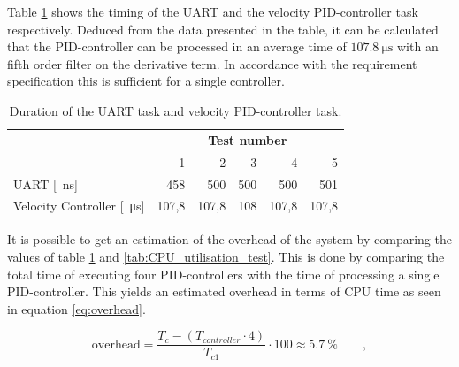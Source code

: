 \documentclass[../../main.tex]{subfiles}
\begin{document}
Table \ref{tab:Task_Timing} shows the timing of the UART and the velocity PID-controller task respectively. Deduced from the data presented in the table, it can be calculated that the PID-controller can be processed in an average time of $\SI{107,8}{\micro \second}$ with an fifth order filter on the derivative term. In accordance with the requirement specification this is sufficient for a single controller.
\begin{table}[H]
\centering
\begin{tabular}{lrrrrr}
\multicolumn{1}{c}{\textbf{}}            & \multicolumn{5}{c}{\textbf{Test number}}                                                                                                 \\
\multicolumn{1}{l|}{}                    & \multicolumn{1}{r|}{1}     & \multicolumn{1}{r|}{2}     & \multicolumn{1}{r|}{3}    & \multicolumn{1}{r|}{4}     & \multicolumn{1}{r}{5} \\ \hline
\multicolumn{1}{l|}{UART [\SI{}{\nano\second}]}                & \multicolumn{1}{r|}{458}   & \multicolumn{1}{r|}{500}   & \multicolumn{1}{r|}{500}  & \multicolumn{1}{r|}{500}   & 501                   \\
\multicolumn{1}{l|}{Velocity Controller [\SI{}{\micro\second}]} & \multicolumn{1}{r|}{107,8} & \multicolumn{1}{r|}{107,8} & \multicolumn{1}{r|}{108}  & \multicolumn{1}{r|}{107,8} & 107,8                
\end{tabular}
\caption{Duration of the  UART task and velocity PID-controller task.}
\label{tab:Task_Timing}
\end{table}
It is possible to get an estimation of the overhead of the system by comparing the values of table \ref{tab:Task_Timing} and \ref{tab:CPU_utilisation_test}. This is done by comparing the total time of executing four PID-controllers with the time of processing a single PID-controller. This yields an estimated overhead in terms of CPU time as seen in equation \ref{eq:overhead}.

\begin{equation}\label{eq:overhead}
    \mathrm{overhead}=\frac{T_{c}-(T_{controller}\cdot 4)}{T_{c1}}\cdot 100 \approx \SI{5,7}{\percent} \qquad ,
\end{equation}



\end{document}
